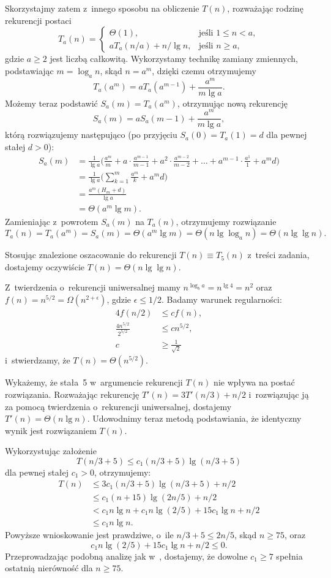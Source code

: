 Skorzystajmy zatem z~innego sposobu na obliczenie $T(n)$, rozważając rodzinę rekurencji postaci
\[
	T_a(n) = \begin{cases}
		\Theta(1), & \text{jeśli $1\le n<a$}, \\
		aT_a(n/a)+n/\!\lg n, & \text{jeśli $n\ge a$},
	\end{cases}
\]
gdzie $a\ge2$ jest liczbą całkowitą. Wykorzystamy technikę zamiany zmiennych, podstawiając $m=\log_an$, skąd $n=a^m$, dzięki czemu otrzymujemy
\[
	T_a(a^m) = aT_a(a^{m-1})+\frac{a^m}{m\lg a}.
\]
Możemy teraz podstawić $S_a(m)=T_a(a^m)$, otrzymując nową rekurencję
\[
	S_a(m) = aS_a(m-1)+\frac{a^m}{m\lg a},
\]
którą rozwiązujemy następująco (po przyjęciu $S_a(0)=T_a(1)=d$ dla pewnej stałej $d>0$):
\begin{align*}
	S_a(m) &= \frac{1}{\lg a}\biggl(\frac{a^m}{m}+a\cdot\frac{a^{m-1}}{m-1}+a^2\cdot\frac{a^{m-2}}{m-2}+\dots+a^{m-1}\cdot\frac{a^1}{1}+a^md\biggr) \\[1mm]
	&= \frac{1}{\lg a}\biggl(\sum_{k=1}^m\frac{a^m}{k}+a^md\biggr) \\[1mm]
	&= \frac{a^m(H_m+d)}{\lg a} \\[1mm]
	&= \Theta(a^m\lg m).
\end{align*}
Zamieniając z~powrotem $S_a(m)$ na $T_a(n)$, otrzymujemy rozwiązanie
\[
	T_a(n) = T_a(a^m) = S_a(m) = \Theta(a^m\lg m) = \Theta(n\lg\log_a n) = \Theta(n\lg\lg n).
\]

Stosując znalezione oszacowanie do rekurencji $T(n)\equiv T_5(n)$ z~treści zadania, dostajemy oczywiście $T(n)=\Theta(n\lg\lg n)$.

\subproblem %
Z~twierdzenia o~rekurencji uniwersalnej mamy $n^{\log_ba}=n^{\lg4}=n^2$ oraz $f(n)=n^{5/2}=\Omega(n^{2+\epsilon})$, gdzie $\epsilon\le1/2$. Badamy warunek regularności:
\begin{align*}
	4f(n/2) &\le cf(n), \\
	\frac{4n^{5/2}}{2^{5/2}} &\le cn^{5/2}, \\
	c &\ge \frac{1}{\sqrt{2}}
\end{align*}
i~stwierdzamy, że $T(n)=\Theta(n^{5/2})$.

\subproblem %
Wykażemy, że stała~5 w~argumencie rekurencji $T(n)$ nie wpływa na postać rozwiązania. Rozważając rekurencję $T'(n)=3T'(n/3)+n/2$ i~rozwiązując ją za pomocą twierdzenia o~rekurencji uniwersalnej, dostajemy $T'(n)=\Theta(n\lg n)$. Udowodnimy teraz metodą podstawiania, że identyczny wynik jest rozwiązaniem $T(n)$.

Wykorzystując założenie
\[
	T(n/3+5) \le c_1(n/3+5)\lg(n/3+5)
\]
dla pewnej stałej $c_1>0$, otrzymujemy:
\begin{align*}
	T(n) &\le 3c_1(n/3+5)\lg(n/3+5)+n/2 \\
	&\le c_1(n+15)\lg(2n/5)+n/2 \\
	&< c_1n\lg n+c_1n\lg(2/5)+15c_1\!\lg n+n/2 \\
	&\le c_1n\lg n.
\end{align*}
Powyższe wnioskowanie jest prawdziwe, o~ile $n/3+5\le2n/5$, skąd $n\ge75$, oraz
\[
	c_1n\lg(2/5)+15c_1\!\lg n+n/2 \le 0.
\]
Przeprowadzając podobną analizę jak w~, dostajemy, że dowolne $c_1\ge7$ spełnia ostatnią nierówność dla $n\ge75$.

